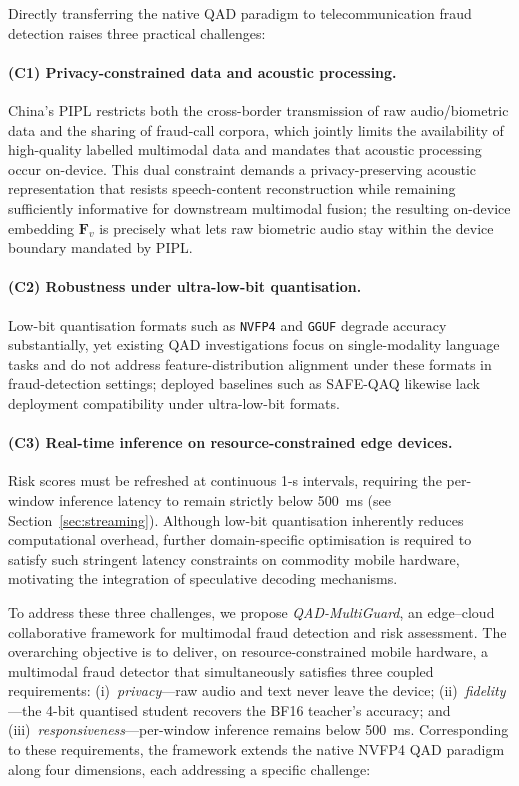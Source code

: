 \documentclass[a4paper,fleqn]{cas-sc}
\begin{document}
Directly transferring the native QAD paradigm to telecommunication fraud detection raises three practical challenges:

\paragraph{(C1) Privacy-constrained data and acoustic processing.}
China's PIPL restricts both the cross-border transmission of raw audio/biometric data and the sharing of fraud-call corpora, which jointly limits the availability of high-quality labelled multimodal data and mandates that acoustic processing occur on-device. This dual constraint demands a privacy-preserving acoustic representation that resists speech-content reconstruction while remaining sufficiently informative for downstream multimodal fusion; the resulting on-device embedding $\bm{F}_v$ is precisely what lets raw biometric audio stay within the device boundary mandated by PIPL.

\paragraph{(C2) Robustness under ultra-low-bit quantisation.}
Low-bit quantisation formats such as \texttt{NVFP4} and \texttt{GGUF} degrade accuracy substantially, yet existing QAD investigations focus on single-modality language tasks and do not address feature-distribution alignment under these formats in fraud-detection settings; deployed baselines such as SAFE-QAQ likewise lack deployment compatibility under ultra-low-bit formats.

\paragraph{(C3) Real-time inference on resource-constrained edge devices.}
Risk scores must be refreshed at continuous 1-s intervals, requiring the per-window inference latency to remain strictly below 500~ms (see Section~\ref{sec:streaming}). Although low-bit quantisation inherently reduces computational overhead, further domain-specific optimisation is required to satisfy such stringent latency constraints on commodity mobile hardware, motivating the integration of speculative decoding mechanisms.

To address these three challenges, we propose \textit{QAD-MultiGuard}, an edge--cloud collaborative framework for multimodal fraud detection and risk assessment. The overarching objective is to deliver, on resource-constrained mobile hardware, a multimodal fraud detector that simultaneously satisfies three coupled requirements: (i)~\textit{privacy}---raw audio and text never leave the device; (ii)~\textit{fidelity}---the 4-bit quantised student recovers the BF16 teacher's accuracy; and (iii)~\textit{responsiveness}---per-window inference remains below 500~ms. Corresponding to these requirements, the framework extends the native NVFP4 QAD paradigm along four dimensions, each addressing a specific challenge:
\end{document}
